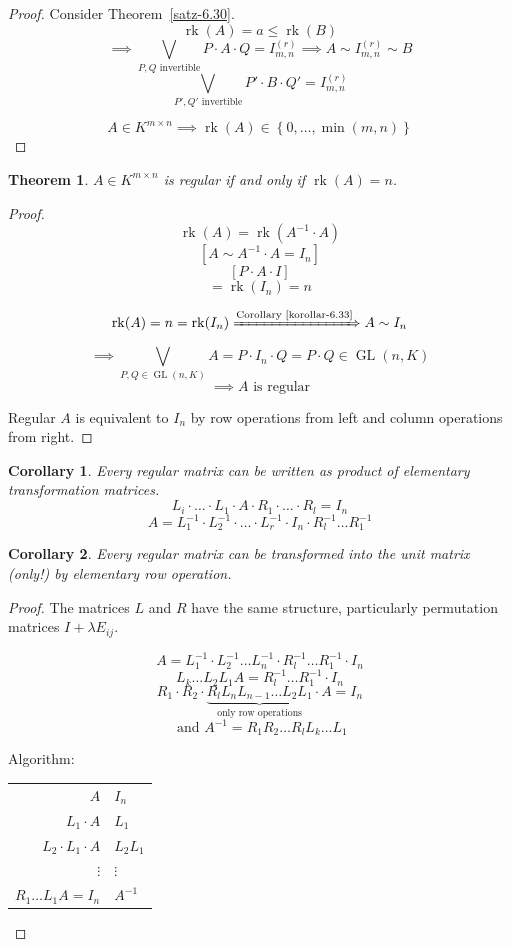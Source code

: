 \documentclass[a4paper,landscape,twocolumn]{article}
\newcommand\set[1]{\left\{#1\right\}}
\newtheorem{theorem}{Theorem}[section]
\newtheorem{cor}{Corollary}[section]
\begin{document}
\begin{proof}
  Consider Theorem~\ref{satz-6.30}.
  \[ \operatorname{rk}(A) = a \leq \operatorname{rk}(B) \]
  \[ \implies \bigvee_{P,Q \text{ invertible}} P \cdot A \cdot Q = I_{m,n}^{(r)} \implies A \sim I_{m,n}^{(r)} \sim B \]
  \[ \bigvee_{P', Q' \text{ invertible}} P' \cdot B \cdot Q' = I_{m,n}^{(r)} \]

  \[ A \in K^{m\times n} \implies \operatorname{rk}(A) \in \set{0, \ldots, \min(m,n)} \]
\end{proof}

\begin{theorem}
  \label{satz-6.34}
  $A \in K^{m\times n}$ is regular if and only if $\operatorname{rk}(A) = n$.
\end{theorem}
\begin{proof}
  \[ \operatorname{rk}(A) = \operatorname{rk}(A^{-1} \cdot A) \]
  \[ \left[ A \sim A^{-1} \cdot A = I_n \right] \]
  \[ \left[ P \cdot A \cdot I \right] \]
  \[ = \operatorname{rk}(I_n) = n \]

  \[
    \operatorname{rk}(A) = n = \operatorname{rk}(I_n)
    \xRightarrow{\text{Corollary~\ref{korollar-6.33}}}
    A \sim I_n
  \] \[
    \implies
    \bigvee_{P,Q \in \operatorname{GL}(n,K)} A
    = P \cdot I_n \cdot Q
    = P \cdot Q \in \operatorname{GL}(n, K)
  \]
  \[ \implies A \text{ is regular} \]

  Regular $A$ is equivalent to $I_n$ by row operations from left and column operations from right.
\end{proof}
%
\begin{cor}
  \label{korollar-6.35}
  Every regular matrix can be written as product of elementary transformation matrices.
  \[ L_i \cdot \ldots \cdot L_1 \cdot A \cdot R_1 \cdot \ldots \cdot R_l = I_n \]
  \[ A = L_1^{-1} \cdot L_{2}^{-1} \cdot \ldots \cdot L_r^{-1} \cdot I_n \cdot R_l^{-1} \ldots R_{1}^{-1} \]
\end{cor}
%
\begin{cor}
  \label{korollar-6.36}
  Every regular matrix can be transformed into the unit matrix (only!) by elementary row operation.
\end{cor}
\begin{proof}
  The matrices $L$ and $R$ have the same structure,
  particularly permutation matrices $I + \lambda E_{ij}$.

  \[ A = L_1^{-1} \cdot L_2^{-1} \ldots L_n^{-1} \cdot R_l^{-1} \ldots R_1^{-1} \cdot I_n \]
  \[ L_k \ldots L_2 L_1 A = R_l^{-1} \ldots R_1^{-1} \cdot I_n \]
  \[ R_1 \cdot R_2 \cdot \underbrace{R_l L_n L_{n-1} \ldots L_2 L_1}_{\text{only row operations}} \cdot A = I_n \]
  \[ \text{ and } A^{-1} = R_1 R_2 \ldots R_l L_k \ldots L_1 \]

  Algorithm:
  \begin{tabular}{r|l}
      $A$ & $I_n$ \\
      $L_1 \cdot A$ & $L_1$ \\
      $L_2 \cdot L_1 \cdot A$ & $L_2 L_1$ \\
      $\vdots$ & $\vdots$ \\
      $R_1 \ldots L_1 A = I_n$ & $A^{-1}$
  \end{tabular}
\end{proof}
\end{document}

